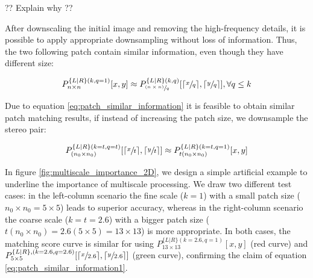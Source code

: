 \documentclass[runningheads]{llncs}
\begin{document}
?? Explain why ??

After downscaling the initial image and removing the high-frequency details, it is possible to apply appropriate downsampling without loss of information. Thus, the two following patch contain similar information, even though they have different size:

\begin{gather} \label{eq:patch_similar_information}
    P^{ \{L|R\} (k,q=1)}_{n \times n}[x,y] \approx P^{ \{L|R\} (k,q)}_{\sfrac{(n \times n)}{q}}[\lceil \sfrac{x}{q} \rceil,\lceil \sfrac{y}{q} \rceil], \forall q \leq k
\end{gather}{}

Due to equation \ref{eq:patch_similar_information} it is feasible to obtain similar patch matching results, if instead of increasing the patch size, we downsample the stereo pair:

\begin{gather} \label{eq:patch_similar_information1}
     P^{ \{L|R\} (k = t, q = t)}_{(n_0 \times n_0)}[\lceil \sfrac{x}{t} \rceil, \lceil \sfrac{y}{t} \rceil] \approx P^{ \{L|R\} (k = t, q = 1)}_{t(n_0 \times n_0)}[x,y] 
\end{gather}{}

In figure \ref{fig:multiscale_importance_2D}, we design a simple artificial example to underline the importance of multiscale processing. We draw two different test cases: in the left-column scenario the fine scale ($k=1$) with a small patch size ($n_0 \times n_0 = 5 \times 5$) leads to superior accuracy, whereas in the right-column scenario the coarse scale ($k=t=2.6$) with a bigger patch size ($t(n_0 \times n_0) = 2.6(5 \times 5) =13 \times 13$) is more appropriate. In both cases, the matching score curve is similar for using $ P^{ \{L|R\} (k = 2.6, q = 1)}_{13 \times 13}[x,y] $ (red curve) and $P^{ \{L|R\}, (k = 2.6, q = 2.6)}_{5 \times 5}[\lceil \sfrac{x}{2.6} \rceil, \lceil \sfrac{y}{2.6} \rceil ]$ (green curve), confirming the claim of equation \ref{eq:patch_similar_information1}.
\end{document}
